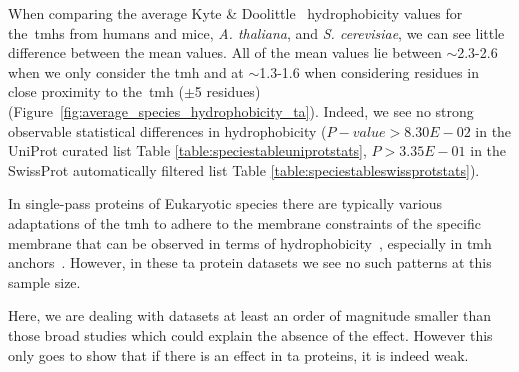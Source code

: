 When comparing the average Kyte \& Doolittle~\cite{Kyte1982} hydrophobicity values for the~\gls{tmh}s from humans and mice, \textit{A. thaliana}, and  \textit{S. cerevisiae}, we can see little difference between the mean values.
All of the mean values lie between $\sim$2.3-2.6 when we only consider the \gls{tmh} and at $\sim$1.3-1.6 when considering residues in close proximity to the~\gls{tmh} ($\pm$5 residues) (Figure~\ref{fig:average_species_hydrophobicity_ta}).
Indeed, we see no strong observable statistical differences in hydrophobicity ($P-value>8.30E-02$ in the UniProt curated list Table \ref{table:speciestableuniprotstats}, $P>3.35E-01$ in the SwissProt automatically filtered list Table \ref{table:speciestableswissprotstats}).

In single-pass proteins of Eukaryotic species there are typically various adaptations of the \gls{tmh} to adhere to the membrane constraints of the specific membrane that can be observed in terms of hydrophobicity~\cite{Sharpe2010}, especially in \gls{tmh} anchors~\cite{Baker2017}.
However, in these \gls{ta} protein datasets we see no such patterns at this sample size.

Here, we are dealing with datasets at least an order of magnitude smaller than those broad studies which could explain the absence of the effect.
However this only goes to show that if there is an effect in \gls{ta} proteins, it is indeed weak.

